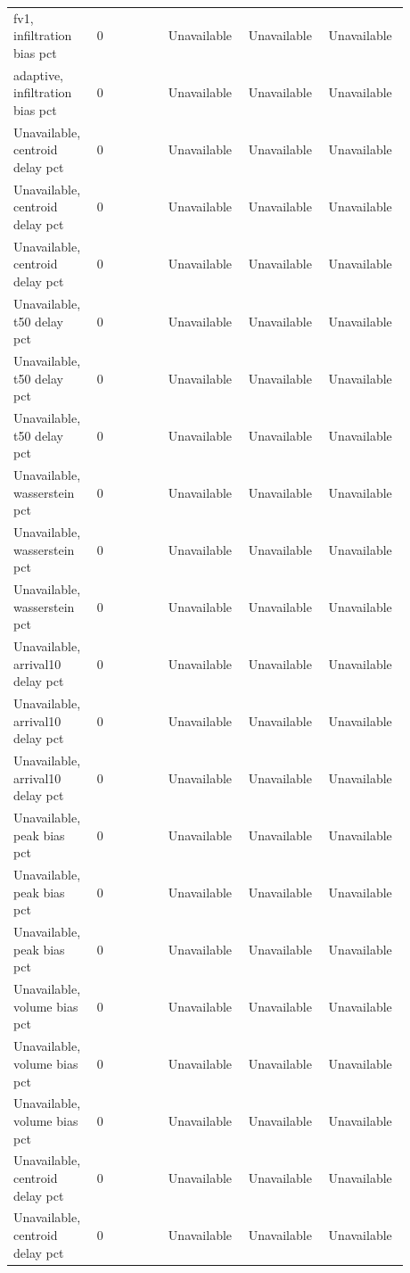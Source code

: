 \begin{longtable}{p{0.1760\linewidth}p{0.1760\linewidth}p{0.1760\linewidth}p{0.1760\linewidth}p{0.1760\linewidth}}
fv1, infiltration bias pct & 0 & Unavailable & Unavailable & Unavailable \\
adaptive, infiltration bias pct & 0 & Unavailable & Unavailable & Unavailable \\
Unavailable, centroid delay pct & 0 & Unavailable & Unavailable & Unavailable \\
Unavailable, centroid delay pct & 0 & Unavailable & Unavailable & Unavailable \\
Unavailable, centroid delay pct & 0 & Unavailable & Unavailable & Unavailable \\
Unavailable, t50 delay pct & 0 & Unavailable & Unavailable & Unavailable \\
Unavailable, t50 delay pct & 0 & Unavailable & Unavailable & Unavailable \\
Unavailable, t50 delay pct & 0 & Unavailable & Unavailable & Unavailable \\
Unavailable, wasserstein pct & 0 & Unavailable & Unavailable & Unavailable \\
Unavailable, wasserstein pct & 0 & Unavailable & Unavailable & Unavailable \\
Unavailable, wasserstein pct & 0 & Unavailable & Unavailable & Unavailable \\
Unavailable, arrival10 delay pct & 0 & Unavailable & Unavailable & Unavailable \\
Unavailable, arrival10 delay pct & 0 & Unavailable & Unavailable & Unavailable \\
Unavailable, arrival10 delay pct & 0 & Unavailable & Unavailable & Unavailable \\
Unavailable, peak bias pct & 0 & Unavailable & Unavailable & Unavailable \\
Unavailable, peak bias pct & 0 & Unavailable & Unavailable & Unavailable \\
Unavailable, peak bias pct & 0 & Unavailable & Unavailable & Unavailable \\
Unavailable, volume bias pct & 0 & Unavailable & Unavailable & Unavailable \\
Unavailable, volume bias pct & 0 & Unavailable & Unavailable & Unavailable \\
Unavailable, volume bias pct & 0 & Unavailable & Unavailable & Unavailable \\
Unavailable, centroid delay pct & 0 & Unavailable & Unavailable & Unavailable \\
Unavailable, centroid delay pct & 0 & Unavailable & Unavailable & Unavailable \\

\end{longtable}
